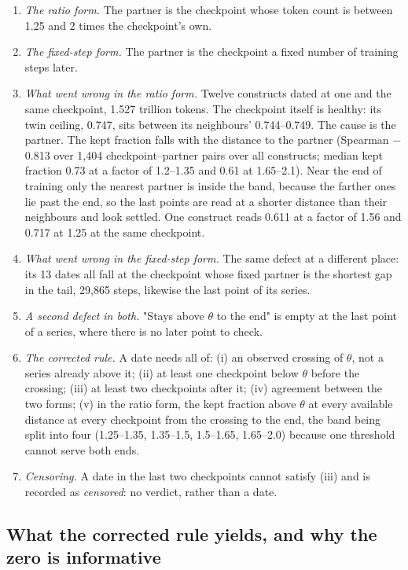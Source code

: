 \documentclass{article}
\begin{document}
\begin{enumerate}[topsep=2pt,itemsep=1pt,parsep=0pt,partopsep=0pt,leftmargin=*]
\item \emph{The ratio form.} The partner is the checkpoint whose token count is between 1.25 and 2 times the checkpoint's own.
\item \emph{The fixed-step form.} The partner is the checkpoint a fixed number of training steps later.
\item \emph{What went wrong in the ratio form.} Twelve constructs dated at one and the same checkpoint, 1.527 trillion tokens. The checkpoint itself is healthy: its twin ceiling, 0.747, sits between its neighbours' 0.744--0.749. The cause is the partner. The kept fraction falls with the distance to the partner (Spearman $-$0.813 over 1,404 checkpoint--partner pairs over all constructs; median kept fraction 0.73 at a factor of 1.2--1.35 and 0.61 at 1.65--2.1). Near the end of training only the nearest partner is inside the band, because the farther ones lie past the end, so the last points are read at a shorter distance than their neighbours and look settled. One construct reads 0.611 at a factor of 1.56 and 0.717 at 1.25 at the same checkpoint.
\item \emph{What went wrong in the fixed-step form.} The same defect at a different place: its 13 dates all fall at the checkpoint whose fixed partner is the shortest gap in the tail, 29,865 steps, likewise the last point of its series.
\item \emph{A second defect in both.} "Stays above $\theta$ to the end" is empty at the last point of a series, where there is no later point to check.
\item \emph{The corrected rule.} A date needs all of: (i) an observed crossing of $\theta$, not a series already above it; (ii) at least one checkpoint below $\theta$ before the crossing; (iii) at least two checkpoints after it; (iv) agreement between the two forms; (v) in the ratio form, the kept fraction above $\theta$ at every available distance at every checkpoint from the crossing to the end, the band being split into four (1.25--1.35, 1.35--1.5, 1.5--1.65, 1.65--2.0) because one threshold cannot serve both ends.
\item \emph{Censoring.} A date in the last two checkpoints cannot satisfy (iii) and is recorded as \emph{censored}: no verdict, rather than a date.
\end{enumerate}

\subsection{What the corrected rule yields, and why the zero is informative}
\end{document}
